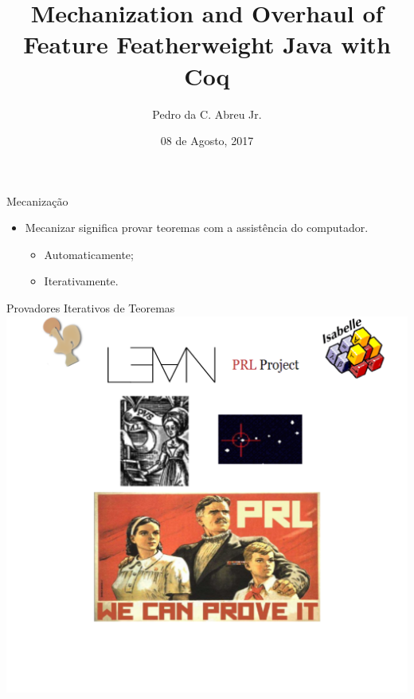 \documentclass{beamer}
\title[Mechanization and Overhaul of FFJ]{Mechanization and Overhaul of Feature Featherweight Java with Coq}
\author{Pedro da C. Abreu Jr.}
\institute[UnB]
{
	Universidade de Brasilia 
}
\date{08 de Agosto, 2017}
\begin{document}
	
	\begin{frame}
		\titlepage
	\end{frame}
	

    \begin{frame}{Mecanização}
        \begin{itemize}
            \item Mecanizar significa provar teoremas com a assistência do computador.
                \begin{itemize}
                    \item<2-> Automaticamente;
                    \item<3-> Iterativamente.
                \end{itemize}
        \end{itemize}
    \end{frame}

    \begin{frame}{Provadores Iterativos de Teoremas}
        \includegraphics[width=\textwidth, height=\textheight]{itp_logos}
    \end{frame}
\end{document}

